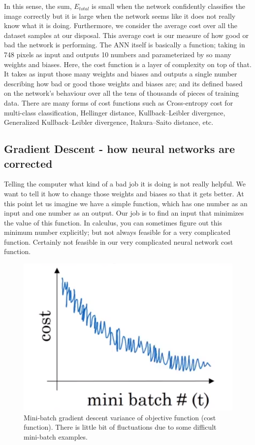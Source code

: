 \documentclass[master]{thesis-uestc}
\begin{document}
In this sense, the sum, $E_{total}$ is small when the network confidently classifies the image correctly but it is large when the network seems like it does not really know what it is doing. Furthermore, we consider the average cost over all the dataset samples at our disposal. This average cost is our measure of how good or bad the network is performing. The ANN itself is basically a function; taking in 748 pixels as input and outputs 10 numbers and parameterized by so many weights and biases. Here, the cost function is a layer of complexity on top of that. It takes as input those many weights and biases and outputs a single number describing how bad or good those weights and biases are; and its defined based on the network's behaviour over all the tens of thousands of pieces of training data. There are many forms of cost functions such as Cross-entropy cost for multi-class classification, Hellinger distance, Kullback–Leibler divergence, Generalized Kullback–Leibler divergence, Itakura–Saito distance, etc.

\subsection{Gradient Descent - how neural networks are corrected}
Telling the computer what kind of a bad job it is doing is not really helpful. We want to tell it how to change those weights and biases so that it gets better. At this point let us imagine we have a simple function, which has one number as an input and one number as an output. Our job is to find an input that minimizes the value of this function. In calculus, you can sometimes figure out this minimum number explicitly; but not always feasible for a very complicated function. Certainly not feasible in our very complicated neural network cost function. 

\begin{figure}[ht]
\includegraphics[width=5in]{pic/mini-batch.PNG}
\caption{Mini-batch gradient descent variance of objective function (cost function). There is little bit of fluctuations due to some difficult mini-batch examples.}
\label{mini-batch}
\end{figure}
\end{document}
